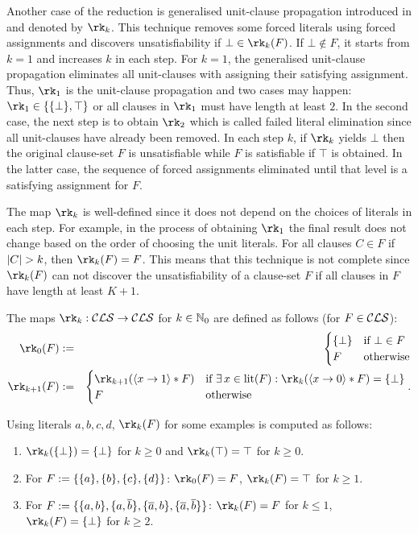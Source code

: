 \documentclass{report}
\begin{document}
Another case of the reduction is generalised unit-clause propagation introduced in \cite{h10} and denoted by $\rk_k$. This technique removes some forced literals using forced assignments and discovers unsatisfiability if $\bot \in \rk_k(F)$. If $\bot \not \in F$, it starts from $k=1$ and increases $k$ in each step. For $k=1$, the generalised unit-clause propagation eliminates all unit-clauses with assigning their satisfying assignment. Thus, $\rk_1$ is the unit-clause propagation and two cases may happen:  $\rk_1 \in \set{\set{\bot},\top}$ or all clauses in $\rk_1$ must have length at least $2$. In the second case, the next step is to obtain $\rk_2$ which is called failed literal elimination since all unit-clauses have already been removed. In each step $k$, if $\rk_k$ yields $\bot$ then the original clause-set $F$ is unsatisfiable while $F$ is satisfiable if $\top$ is obtained. In the latter case, the sequence of forced assignments eliminated until that level is a satisfying assignment for $F$.

The map $\rk_k$ is well-defined since it does not depend on the choices of literals in each step. For example, in the process of obtaining  $\rk_1$ the final result does not change based on the order of choosing the unit literals. For all clauses $C \in F$ if $\lvert C \rvert > k$, then $\rk_k(F) = F$. This means that this technique is not complete since $\rk_k(F)$ can not discover the unsatisfiability of a clause-set $F$ if all clauses in $F$ have length at least $K+1$.

\begin{defi}\label{def:rk}
\cite{h10} The maps $\rk_k: \Cls \ra \Cls$ for $k \in \mathbb{N}_0$ are defined as follows (for $F \in \mathcal{CLS}$):
  \begin{eqnarray*}
  \rk_0(F) & := &
  \begin{cases}
  \set{\bot} & \text{if } \bot \in F\\ F & \text{otherwise}
  \end{cases}\\
  \rk_{k+1}(F) & := &
  \begin{cases}
  \rk_{k+1}(\pao x1 * F) & \text{if } \ex\, x \in \lit(F) : \rk_k(\pao x0 * F) = \set{\bot}\\ F & \text{otherwise}
  \end{cases}.
  \end{eqnarray*}
\end{defi}

\begin{examp}\label{exp:rk}
Using literals $a,b,c,d$, $\rk_k(F)$ for some examples is computed as follows:
  \begin{enumerate}
  \item $\rk_k(\set{\bot}) = \set{\bot}$ for $k \ge 0$ and $\rk_k(\top) = \top$ for $k \ge 0$.
  \item For $F := \{ \{ a \},\{ b \},\{ c \},\{ d \} \}$: $\rk_0(F) = F$, $\rk_k(F) = \top$ for $k \ge 1$.
  \item For $F := \{ \{ a,b \},\{ a,\overline{b} \}, \{ \overline{a},b \},\{ \overline{a},\overline{b} \} \}$: $\rk_k(F) = F$ for $k \le 1$, $\rk_k(F) = \set{\bot}$ for $k \ge 2$.
  \end{enumerate}
\end{examp}
\end{document}
